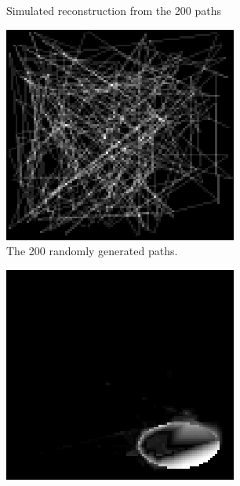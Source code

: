 \documentclass[english]{article}\usepackage[]{graphicx}\usepackage[]{color}
\begin{document}
\begin{figure}[H]
\begin{subfigure}{.22\textwidth}
  \caption{Simulated reconstruction from the 200 paths}
  \vspace{10pt}
  \label{fig:adp_randpaths_sim_rec}
\end{subfigure}%
\hspace{10pt}
\begin{subfigure}{.22\textwidth}
  \centering
    \includegraphics[width=1\linewidth]{figures/nonadaptiveresultpath}
  \caption{The 200 randomly generated paths.}
  \vspace{20pt}
  \label{fig:adp_randpaths_sim}
\end{subfigure}%
\hspace {10pt}
\begin{subfigure}{.22\textwidth}
  \centering
    \includegraphics[width=1\linewidth]{figures/nonadaptiveresulterror}

\end{subfigure}
\end{figure}
\end{document}
